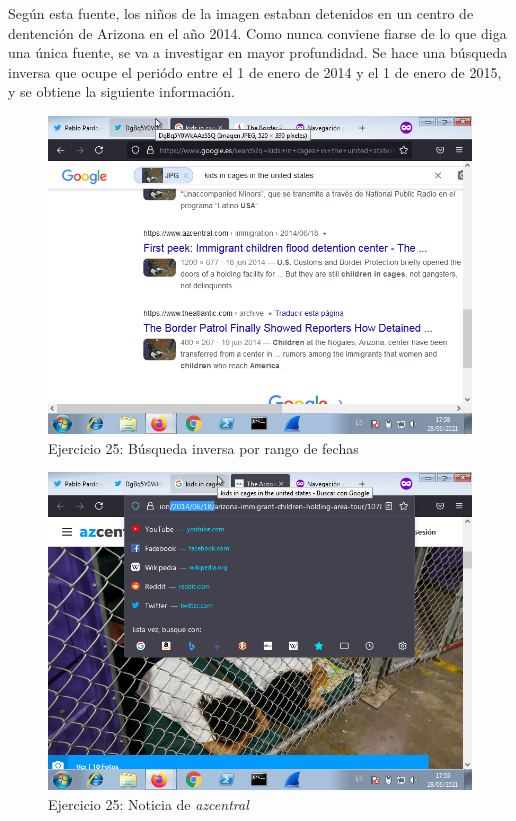 \documentclass[11pt]{article}
\begin{document}
Según esta fuente, los niños de la imagen estaban detenidos en un centro de dentención de Arizona en el año 2014. Como nunca conviene fiarse de lo que diga una única fuente, se va a investigar en mayor profundidad. Se hace una búsqueda inversa que ocupe el periódo entre el 1 de enero de 2014 y el 1 de enero de 2015, y se obtiene la siguiente información.

\begin{figure}[H]
    \caption{Ejercicio 25: Búsqueda inversa por rango de fechas}
  \centering
    \includegraphics[scale=0.8]{p05/e31-6.png}
\end{figure}

\begin{figure}[H]
    \caption{Ejercicio 25: Noticia de \textit{azcentral}}
  \centering
    \includegraphics[scale=0.8]{p05/e31-4.png}
\end{figure}
\end{document}
